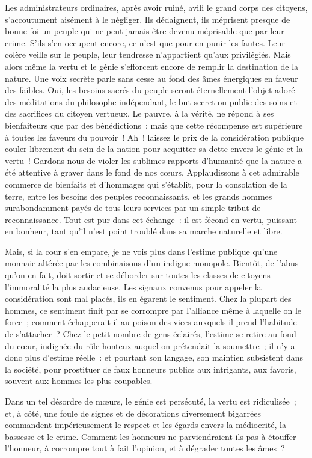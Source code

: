 \documentclass[french,twoside]{book} %
\begin{document}
Les administrateurs ordinaires, après avoir ruiné, avili le grand corps des citoyens, s’accoutument aisément à le négliger. Ils dédaignent, ils méprisent presque de bonne foi un peuple qui ne peut jamais être devenu méprisable que par leur crime. S’ils s’en occupent encore, ce n’est que pour en punir les fautes. Leur colère veille sur le peuple, leur tendresse n’appartient qu’aux privilégiés. Mais alors même la vertu et le génie s’efforcent encore de remplir la destination de la nature. Une voix secrète parle sans cesse au fond des âmes énergiques en faveur des faibles. Oui, les besoins sacrés du peuple seront éternellement l’objet adoré des méditations du philosophe indépendant, le but secret ou public des soins et des sacrifices du citoyen vertueux. Le pauvre, à la vérité, ne répond à ses bienfaiteurs que par des bénédictions ; mais que cette récompense est supérieure à toutes les faveurs du pouvoir ! Ah ! laissez le prix de la considération publique couler librement du sein de la nation pour acquitter sa dette envers le génie et la vertu ! Gardons-nous de violer les sublimes rapports d’humanité que la nature a été attentive à graver dans le fond de nos cœurs. Applaudissons à cet admirable commerce de bienfaits et d’hommages qui s’établit, pour la consolation de la terre, entre les besoins des peuples reconnaissants, et les grands hommes surabondamment payés de tous leurs services par un simple tribut de reconnaissance. Tout est pur dans cet échange : il est fécond en vertu, puissant en bonheur, tant qu’il n’est point troublé dans sa marche naturelle et libre.\par
Mais, si la cour s’en empare, je ne vois plus dans l’estime publique qu’une monnaie altérée par les combinaisons d’un indigne monopole. Bientôt, de l’abus qu’on en fait, doit sortir et se déborder sur toutes les classes de citoyens l’immoralité la plus audacieuse. Les signaux convenus pour appeler la considération sont mal placés, ils en égarent le sentiment. Chez la plupart des hommes, ce sentiment finit par se corrompre par l’alliance même à laquelle on le force ; comment échapperait-il au poison des vices auxquels il prend l’habitude de s’attacher ? Chez le petit nombre de gens éclairés, l’estime se retire au fond du cœur, indignée du rôle honteux auquel on prétendait la soumettre ; il n’y a donc plus d’estime réelle : et pourtant son langage, son maintien subsistent dans la société, pour prostituer de faux honneurs publics aux intrigants, aux favoris, souvent aux hommes les plus coupables.\par
Dans un tel désordre de mœurs, le génie est persécuté, la vertu est ridiculisée ; et, à côté, une foule de signes et de décorations diversement bigarrées commandent impérieusement le respect et les égards envers la médiocrité, la bassesse et le crime. Comment les honneurs ne parviendraient-ils pas à étouffer l’honneur, à corrompre tout à fait l’opinion, et à dégrader toutes les âmes ?\par
\end{document}
